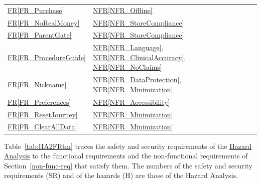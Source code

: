 \documentclass[10pt]{article}
\newcommand{\rref}[1]{\hyperref[#1]{FR\ref*{#1}}}
\newcommand{\nfrref}[1]{\hyperref[#1]{NFR\ref*{#1}}}
\newcommand{\haurl}{https://team-hindsight.github.io/ophthamology-game/HazardAnalysis/HazardAnalysis.pdf}
\newcommand{\hadoc}[1]{\href{\haurl}{#1}}
\begin{document}
\begin{longtable}{p{} p{}}
\rref{FR_Purchase} & \nfrref{NFR_Offline} \\
\rref{FR_NoRealMoney} & \nfrref{NFR_StoreCompliance} \\
\rref{FR_ParentGate} & \nfrref{NFR_StoreCompliance} \\
\rref{FR_ProcedureGuide} & \nfrref{NFR_Language}, \nfrref{NFR_ClinicalAccuracy}, \nfrref{NFR_NoClaims} \\
\rref{FR_Nickname} & \nfrref{NFR_DataProtection}, \nfrref{NFR_Minimization} \\
\rref{FR_Preferences} & \nfrref{NFR_Accessibility} \\
\rref{FR_ResetJourney} & \nfrref{NFR_Minimization} \\
\rref{FR_ClearAllData} & \nfrref{NFR_Minimization} \\
\end{longtable}

Table~\ref{tab:HA2FRtm} traces the safety and security requirements of the
\hadoc{Hazard Analysis} to the functional requirements and the non-functional
requirements of Section~\ref{non-func-req} that satisfy them. The numbers
of the safety and security requirements (SR) and of the hazards (H) are those
of the Hazard Analysis.
\end{document}

